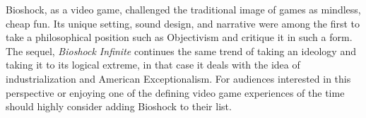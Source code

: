 \documentclass{article}
\begin{document}
Bioshock, as a video game, challenged the traditional image of games as mindless, cheap fun. Its unique setting,
sound design, and narrative were among the first to take a philosophical position such as Objectivism and 
critique it in such a form. The sequel, \textit{Bioshock Infinite} continues the same trend of taking 
an ideology and taking it to its logical extreme, in that case it deals with the idea of industrialization and
American Exceptionalism.  For audiences interested in this perspective or enjoying one of the defining video 
game experiences of the time should highly consider adding Bioshock to their list. 


\printbibliography 
\end{document}
